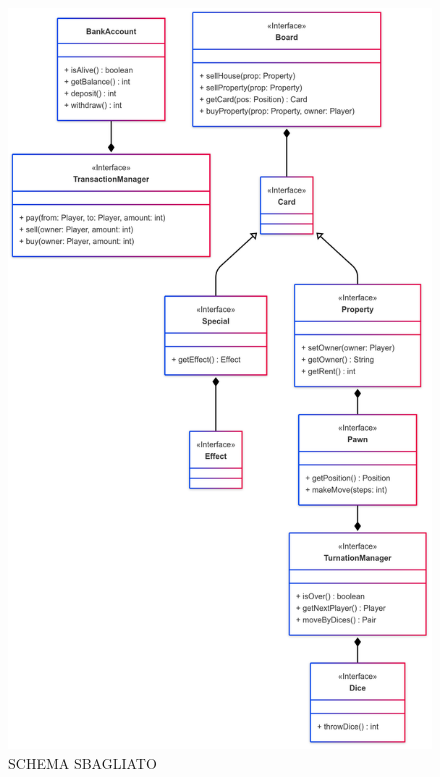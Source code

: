 \begin{figure}[H]
    \centering
    \includegraphics[width=0.5\textheight]{img/architecture_diagram.png}
    \caption{SCHEMA SBAGLIATO}
	\label{img:architecture_diagram}
\end{figure}
